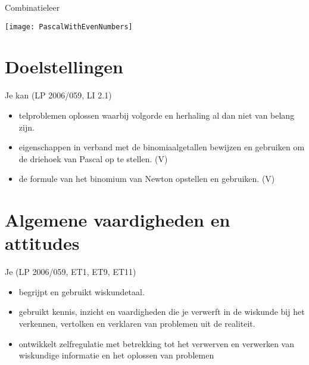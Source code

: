 \documentclass[12pt,a4paper,twoside]{article}
\begin{document}
\begin{center}
  \begin{mdframed}
    \centering
    \fontsize{40}{60}\selectfont Combinatieleer
  \end{mdframed}
  \texttt{[image: PascalWithEvenNumbers]}
\end{center}

\section*{Doelstellingen}
{\singlespacing
Je kan \hfill  {\scriptsize(LP 2006/059, LI 2.1)}
\begin{itemize}
  \itemsep0em
\item telproblemen oplossen waarbij volgorde en herhaling al dan niet van belang zijn.
\item eigenschappen in verband met de binomiaalgetallen bewijzen en gebruiken om de driehoek van Pascal op
  te stellen. (V)
\item de formule van het binomium van Newton opstellen en gebruiken. (V)
\end{itemize}}

\section*{Algemene vaardigheden en attitudes}
\begin{singlespacing}
Je \hfill {\scriptsize(LP 2006/059, ET1, ET9, ET11)}
\begin{itemize}
  \itemsep0em
  \item begrijpt en gebruikt wiskundetaal.
  \item gebruikt kennis, inzicht en vaardigheden die je verwerft in de wiskunde bij het verkennen, vertolken en verklaren van problemen uit de realiteit.
  \item ontwikkelt zelfregulatie met betrekking tot het verwerven en verwerken van wiskundige informatie en het oplossen van problemen
\end{itemize}
\end{singlespacing}
\thispagestyle{empty}

\pagebreak
\begin{singlespacing}
  \scriptsize
  \tableofcontents
\end{singlespacing}
\thispagestyle{empty}

\pagebreak
{}

\pagestyle{fancy}
\fancyhead[RE,LO]{}
\end{document}
